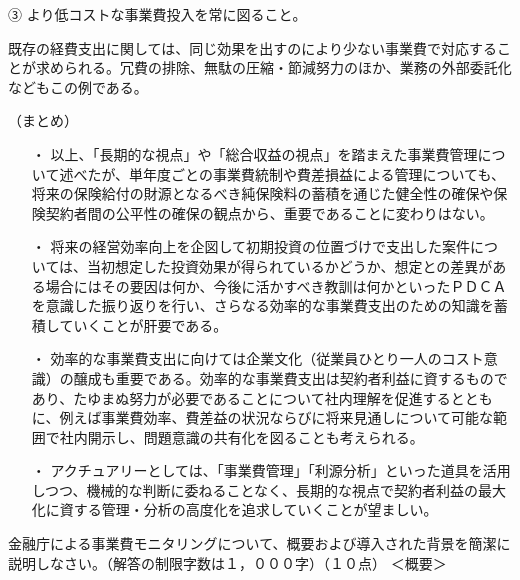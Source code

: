 \documentclass[report,gutter=10mm,fore-edge=10mm,uplatex,dvipdfmx]{jlreq}
\begin{document}
③ より低コストな事業費投入を常に図ること。

既存の経費支出に関しては、同じ効果を出すのにより少ない事業費で対応することが求められる。冗費の排除、無駄の圧縮・節減努力のほか、業務の外部委託化などもこの例である。

（まとめ）

\begin{itemize}
 \item [・]  以上、「長期的な視点」や「総合収益の視点」を踏まえた事業費管理について述べたが、単年度ごとの事業費統制や費差損益による管理についても、将来の保険給付の財源となるべき純保険料の蓄積を通じた健全性の確保や保険契約者間の公平性の確保の観点から、重要であることに変わりはない。
 \item [・]  将来の経営効率向上を企図して初期投資の位置づけで支出した案件については、当初想定した投資効果が得られているかどうか、想定との差異がある場合にはその要因は何か、今後に活かすべき教訓は何かといったＰＤＣＡを意識した振り返りを行い、さらなる効率的な事業費支出のための知識を蓄積していくことが肝要である。
 \item [・]  効率的な事業費支出に向けては企業文化（従業員ひとり一人のコスト意識）の醸成も重要である。効率的な事業費支出は契約者利益に資するものであり、たゆまぬ努力が必要であることについて社内理解を促進するとともに、例えば事業費効率、費差益の状況ならびに将来見通しについて可能な範囲で社内開示し、問題意識の共有化を図ることも考えられる。
 \item [・]  アクチュアリーとしては、「事業費管理」「利源分析」といった道具を活用しつつ、機械的な判断に委ねることなく、長期的な視点で契約者利益の最大化に資する管理・分析の高度化を追求していくことが望ましい。
\end{itemize}

金融庁による事業費モニタリングについて、概要および導入された背景を簡潔に説明しなさい。（解答の制限字数は１，０００字）（１０点） 
\answer{}
＜概要＞
\end{document}
